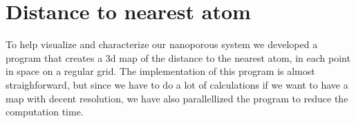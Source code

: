 \section{Distance to nearest atom\label{sec:distance_to_atom}}
To help visualize and characterize our nanoporous system we developed a program that creates a 3d map of the distance to the nearest atom, in each point in space on a regular grid. The implementation of this program is almost straighforward, but since we have to do a lot of calculations if we want to have a map with decent resolution, we have also parallellized the program to reduce the computation time.
